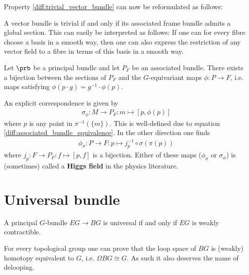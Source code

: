     Property \ref{diff:trivial_vector_bundle} can now be reformulated as follows:
    \begin{property}
        A vector bundle is trivial if and only if its associated frame bundle admits a global section. This can easily be interpreted as follows: If one can for every fibre choose a basis in a smooth way, then one can also express the restriction of any vector field to a fibre in terms of this basis in a smooth way.
    \end{property}

    \begin{property}\label{diff:section_bijection}
        Let $\prb$ be a principal bundle and let $P_F$ be an associated bundle. There exists a bijection between the sections of $P_F$ and the $G$-equivariant maps $\phi:P\rightarrow F$, i.e. maps satisfying $\phi(p\cdot g) = g^{-1}\cdot\phi(p)$.

        An explicit correspondence is given by
        \begin{gather}
            \sigma_\phi:M\rightarrow P_F:m\mapsto [p, \phi(p)]
        \end{gather}
        where $p$ is any point in $\pi^{-1}(\{m\})$. This is well-defined due to equation \ref{diff:associated_bundle_equivalence}. In the other direction one finds
        \begin{gather}
            \label{diff:section_bijection_phi}
            \phi_\sigma:P\rightarrow F: p\mapsto j_p^{-1}\circ\sigma(\pi(p))
        \end{gather}
        where $j_p:F\rightarrow P_F:f\mapsto[p, f]$ is a bijection. Either of these maps ($\phi_\sigma$ or $\sigma_\phi$) is (sometimes) called a \textbf{Higgs field} in the physics literature.
    \end{property}

\section{Universal bundle}

    \begin{property}
        A principal $G$-bundle $EG\rightarrow BG$ is universal if and only if $EG$ is weakly contractible.
    \end{property}
    \begin{property}[Delooping]\label{diff:delooping}
        For every topological group one can prove that the loop space of $BG$ is (weakly) homotopy equivalent to $G$, i.e. $\Omega BG\cong G$. As such it also deserves the name of delooping.
    \end{property}

